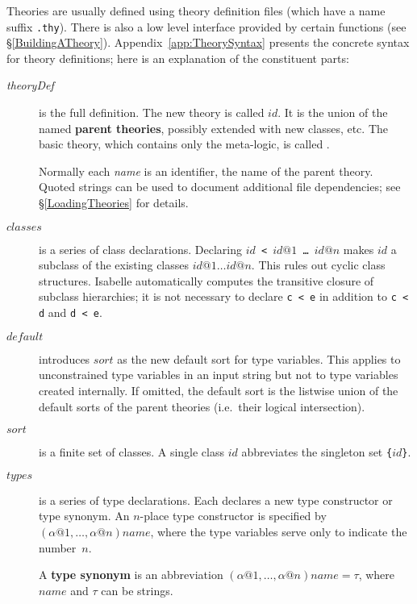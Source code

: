 Theories are usually defined using theory definition files (which have a name
suffix {\tt .thy}). There is also a low level interface provided by certain
\ML{} functions (see \S\ref{BuildingATheory}).
Appendix~\ref{app:TheorySyntax} presents the concrete syntax for theory
definitions; here is an explanation of the constituent parts:
\begin{description}
\item[{\it theoryDef}]
  is the full definition.  The new theory is called $id$.  It is the union
  of the named {\bf parent theories}, possibly
  extended with new classes, etc.  The basic theory, which contains only
  the meta-logic, is called .

  Normally each {\it name\/} is an identifier, the name of the parent theory.
  Quoted strings can be used to document additional file dependencies; see
  \S\ref{LoadingTheories} for details.

\item[$classes$]
  is a series of class declarations.  Declaring {\tt$id$ < $id@1$ \dots\
    $id@n$} makes $id$ a subclass of the existing classes $id@1\dots
  id@n$.  This rules out cyclic class structures.  Isabelle automatically
  computes the transitive closure of subclass hierarchies; it is not
  necessary to declare {\tt c < e} in addition to {\tt c < d} and {\tt d <
    e}.

\item[$default$]
  introduces $sort$ as the new default sort for type variables.  This applies
  to unconstrained type variables in an input string but not to type
  variables created internally.  If omitted, the default sort is the listwise
  union of the default sorts of the parent theories (i.e.\ their logical
  intersection).

\item[$sort$]
  is a finite set of classes.  A single class $id$ abbreviates the singleton
  set {\tt\{}$id${\tt\}}.

\item[$types$]
  is a series of type declarations.  Each declares a new type constructor
  or type synonym.  An $n$-place type constructor is specified by
  $(\alpha@1,\dots,\alpha@n)name$, where the type variables serve only to
  indicate the number~$n$.

  A {\bf type synonym} is an abbreviation
  $(\alpha@1,\dots,\alpha@n)name = \tau$, where $name$ and $\tau$ can
  be strings.


\end{description}
